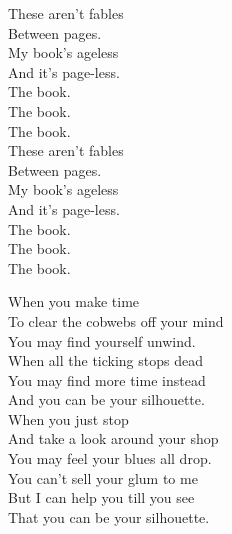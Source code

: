 These aren't fables \\
Between pages. \\
My book's ageless \\
And it's page-less. \\

The book. \\
The book. \\
The book. \\

These aren't fables \\
Between pages. \\
My book's ageless \\
And it's page-less. \\

The book. \\
The book. \\
The book. \\













When you make time \\
To clear the cobwebs off your mind \\
You may find yourself unwind. \\
When all the ticking stops dead \\
You may find more time instead \\
And you can be your silhouette. \\

When you just stop \\
And take a look around your shop \\
You may feel your blues all drop. \\
You can't sell your glum to me \\
But I can help you till you see \\
That you can be your silhouette. \\

